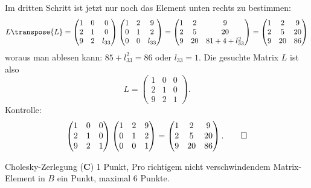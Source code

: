 \begin{loesung}
Im dritten Schritt ist jetzt nur noch das Element unten rechts zu bestimmen:
\[
L\transpose{L}=
\begin{pmatrix}
1&0&     0\\
2&1&     0\\
9&2&l_{33}
\end{pmatrix}
\begin{pmatrix}
1&2&     9\\
0&1&     2\\
0&0&l_{33}
\end{pmatrix}
=
\begin{pmatrix}
1& 2& 9\\
2& 5&20\\
9&20&81+4+l_{33}^2
\end{pmatrix}
=
\begin{pmatrix}
1& 2& 9\\
2& 5&20\\
9&20&86
\end{pmatrix}
\]
woraus man ablesen kann: $85+l_{33}^2=86$ oder $l_{33}=1$. Die gesuchte
Matrix $L$ ist also
\[
L=
\begin{pmatrix}
1&0&0\\
2&1&0\\
9&2&1
\end{pmatrix}.
\]
Kontrolle:
\[
\begin{pmatrix}
1&0&0\\
2&1&0\\
9&2&1
\end{pmatrix}
\begin{pmatrix}
1&2&9\\
0&1&2\\
0&0&1
\end{pmatrix}
=
\begin{pmatrix}
1& 2& 9\\
2& 5&20\\
9&20&86
\end{pmatrix}.
\qedhere
\]
\end{loesung}

\begin{bewertung}
Cholesky-Zerlegung ({\bf C}) 1 Punkt,
Pro richtigem nicht verschwindendem Matrix-Element in $B$ ein Punkt,
maximal 6 Punkte.
\end{bewertung}


